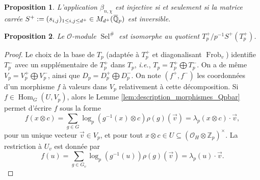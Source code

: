 \documentclass[10pt,a4paper]{amsart}
\newtheorem{proposition}{Proposition}
\DeclareMathOperator{\Frob}{Frob}
\DeclareMathOperator{\Hom}{Hom}
\DeclareMathOperator{\Sel}{Sel}
\newcommand\Zp{{\mathbb{Z}_{p}}}
\newcommand\bQ{\mathbb{Q}}
\newcommand\cO{\mathcal{O}}
\newcommand{\ob}[1]{\mkern 1.5mu\overline{\mkern-1.5mu#1\mkern-1.5mu}\mkern 1.5mu}
\begin{document}
\begin{proposition}\label{prop:S^+}
	L'application $\beta_{n,\chi}$ est injective si et seulement si la matrice carrée $S^+:=(s_{i,j})_{1\leq i,j\leq d^+} \in M_{d^+}(\ob{\bQ}_p)$ est inversible. 
\end{proposition}

\begin{proposition}\label{prop:cyc}
	Le $\cO$-module $\Sel^\#$ est isomorphe au quotient $T_p^+/p^{-1}S^+\left(T_p^+\right)$.
\end{proposition}

\begin{proof}
	Le choix de la base de $T_p$ (adaptée à $T_p^+$ et diagonalisant $\Frob_v$) identifie $T_p^-$ avec un supplémentaire de $T_p^+$ dans $T_p$, \textit{i.e.}, $T_p=T_p^+\bigoplus T_p^-$. On a de même $V_p=V_p^+ \bigoplus V_p^-$, ainsi que $D_p=D_p^+ \bigoplus D_p^-$. 
	On note $(f^+,f^-)$ les coordonnées d'un morphisme $f$ à valeurs dans $V_p$ relativement à cette décomposition. Si $f\in \Hom_G(U,V_p)$, alors le Lemme \ref{lem:description_morphismes_Qpbar} permet d'écrire $f$ sous la forme 
	$$f(x\otimes c) = \sum_{g \in G} \log_p \left(g^{-1}(x)\otimes c \right)\rho(g)(\vec{v}) = \lambda_p(x\otimes c) \cdot \vec{v}, $$ 
	pour un unique vecteur $\vec{v}\in V_p$, et pour tout $x\otimes c \in U \subseteq \left(\cO_H \otimes \Zp\right)^\times$. La restriction à $U_{v}$ est donnée par 
	\begin{equation}\label{eq:expression_f_locale}
	f(u) = \sum_{g\in G_{v}}  \log_p\left(g^{-1}(u)\right)\rho(g)(\vec{v}) = \lambda_p(u)\cdot \vec{v}. 
	\end{equation}
	

\end{proof}
\end{document}
